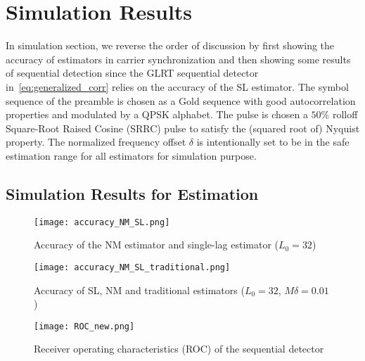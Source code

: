 \section{Simulation Results}%
\label{sec:simulations}

In simulation section, we reverse the order of discussion by first showing the accuracy of estimators in carrier synchronization
and then showing some results of sequential detection since the GLRT sequential detector in~\eqref{eq:generalized_corr} relies on the accuracy of 
the SL estimator. The symbol sequence of the preamble is chosen as a Gold sequence with good autocorrelation properties and
modulated by a QPSK alphabet. The pulse is chosen
a $50\%$ rolloff Square-Root Raised Cosine (SRRC) pulse to satisfy the (squared root of) Nyquist property.
The normalized frequency offset $\delta$ is intentionally set to be in the safe estimation range for all estimators for simulation purpose.

\subsection{Simulation Results for Estimation}

\begin{figure}[t]
    \centerline{\texttt{[image: accuracy\_NM\_SL.png]}}
    \caption{Accuracy of the NM estimator and single-lag estimator ($L_0=32$)}
    \label{fig:accuracy_NM_SL}
    \end{figure}

\begin{figure}[t]
    \centerline{\texttt{[image: accuracy\_NM\_SL\_traditional.png]}}
    \caption{Accuracy of SL, NM and traditional estimators ($L_0=32$, $M\delta=0.01$)}
    \label{fig:accuracy_NM_SL_traditional}
    \end{figure}


\begin{figure}[t]
    \centerline{\texttt{[image: ROC\_new.png]}}
    \caption{Receiver operating characteristics (ROC) of the sequential detector}
    \label{fig:Receiver operating characteristics}
    \end{figure}

